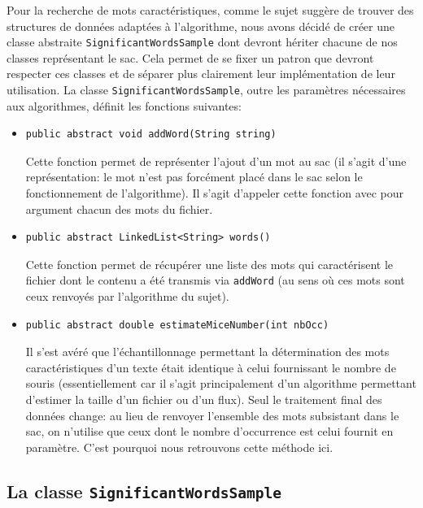 \documentclass[12pt,a4paper,titlepage]{article}
\newcommand{\class}[1]{\texttt{#1}}
\begin{document}
Pour la recherche de mots caractéristiques, comme le sujet suggère de trouver des structures de données adaptées à l'algorithme, nous avons décidé de créer une classe abstraite \class{SignificantWordsSample} dont devront hériter chacune de nos classes représentant le sac. Cela permet de se fixer un patron que devront respecter ces classes et de séparer plus clairement leur implémentation de leur utilisation. La classe \class{SignificantWordsSample}, outre les paramètres nécessaires aux algorithmes, définit les fonctions suivantes:

\begin{itemize}
\item \begin{lstlisting}
public abstract void addWord(String string)
\end{lstlisting}
Cette fonction permet de représenter l'ajout d'un mot au sac (il s'agit d'une représentation: le mot n'est pas forcément placé dans le sac selon le fonctionnement de l'algorithme). Il s'agit d'appeler cette fonction avec pour argument chacun des mots du fichier.

\item \begin{lstlisting}
public abstract LinkedList<String> words()
\end{lstlisting}
Cette fonction permet de récupérer une liste des mots qui caractérisent le fichier dont le contenu a été transmis via \class{addWord} (au sens où ces mots sont ceux renvoyés par l'algorithme du sujet).

\item \begin{lstlisting}
public abstract double estimateMiceNumber(int nbOcc)
\end{lstlisting}
Il s'est avéré que l'échantillonnage permettant la détermination des mots caractéristiques d'un texte était identique à celui fournissant le nombre de souris (essentiellement car il s'agit principalement d'un algorithme permettant d'estimer la taille d'un fichier ou d'un flux). Seul le traitement final des données change: au lieu de renvoyer l'ensemble des mots subsistant dans le sac, on n'utilise que ceux dont le nombre d'occurrence est celui fournit en paramètre. C'est pourquoi nous retrouvons cette méthode ici.
\end{itemize}

\subsection{La classe \class{SignificantWordsSample}}
\end{document}
